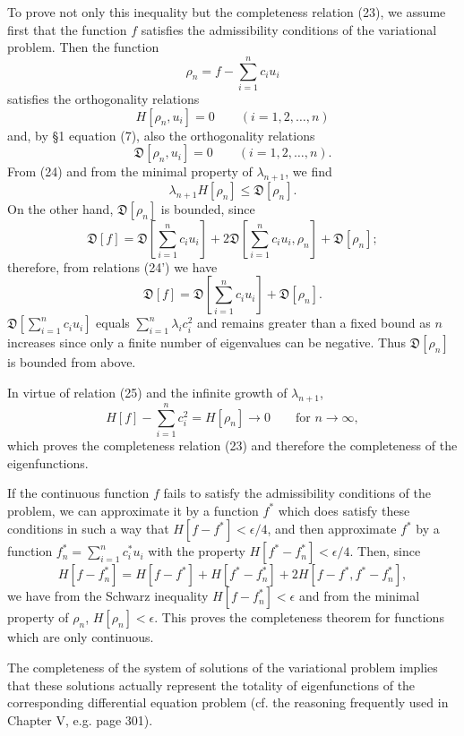 To prove not only this inequality but the completeness relation (23), we assume first that the function $f$ satisfies the admissibility conditions of the variational problem. Then the function
\[
\rho_n=f-\sum_{i=1}^n c_i u_i
\]
satisfies the orthogonality relations
\begin{equation}\tag{24}
H[\rho_n,u_i]=0\qquad(i=1,2,\ldots,n)
\end{equation}
and, by \S1 equation (7), also the orthogonality relations
\begin{equation}\tag{24'}
\mathfrak D[\rho_n,u_i]=0\qquad(i=1,2,\ldots,n).
\end{equation}
From (24) and from the minimal property of $\lambda_{n+1}$, we find
\begin{equation}\tag{25}
\lambda_{n+1}H[\rho_n]\le\mathfrak D[\rho_n].
\end{equation}
On the other hand, $\mathfrak D[\rho_n]$ is bounded, since
\[
\mathfrak D[f]=\mathfrak D\left[\sum_{i=1}^n c_i u_i\right]
+2\mathfrak D\left[\sum_{i=1}^n c_i u_i,\rho_n\right]
+\mathfrak D[\rho_n];
\]
therefore, from relations (24') we have
\[
\mathfrak D[f]=\mathfrak D\left[\sum_{i=1}^n c_i u_i\right]+\mathfrak D[\rho_n].
\]
$\mathfrak D[\sum_{i=1}^n c_i u_i]$ equals $\sum_{i=1}^n\lambda_i c_i^2$ and remains greater than a fixed bound as $n$ increases since only a finite number of eigenvalues can be negative. Thus $\mathfrak D[\rho_n]$ is bounded from above.

In virtue of relation (25) and the infinite growth of $\lambda_{n+1}$,
\[
H[f]-\sum_{i=1}^n c_i^2=H[\rho_n]\to0\qquad\text{for }n\to\infty,
\]
which proves the completeness relation (23) and therefore the completeness of the eigenfunctions.

If the continuous function $f$ fails to satisfy the admissibility conditions of the problem, we can approximate it by a function $f^*$ which does satisfy these conditions in such a way that $H[f-f^*]<\epsilon/4$, and then approximate $f^*$ by a function $f_n^*=\sum_{i=1}^n c_i^*u_i$ with the property $H[f^*-f_n^*]<\epsilon/4$. Then, since
\[
H[f-f_n^*]=H[f-f^*]+H[f^*-f_n^*]+2H[f-f^*,f^*-f_n^*],
\]
we have from the Schwarz inequality $H[f-f_n^*]<\epsilon$ and from the minimal property of $\rho_n$, $H[\rho_n]<\epsilon$. This proves the completeness theorem for functions which are only continuous.

The completeness of the system of solutions of the variational problem implies that these solutions actually represent the totality of eigenfunctions of the corresponding differential equation problem (cf. the reasoning frequently used in Chapter V, e.g. page 301).

